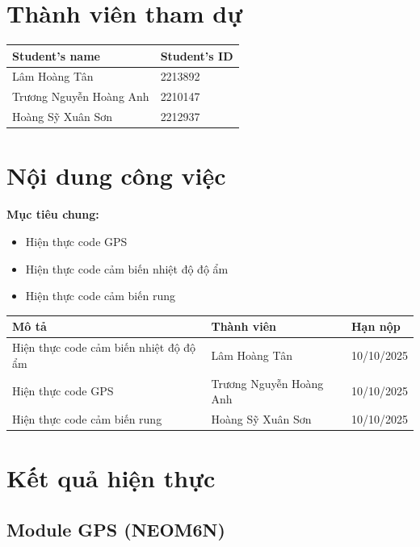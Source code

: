 \section{Thành viên tham dự}
\begin{table}[H]
\centering
\begin{tabular}{|l|l|}
\hline
\textbf{Student’s name} & \textbf{Student’s ID} \\ \hline
Lâm Hoàng Tân           & 2213892                \\ \hline
Trương Nguyễn Hoàng Anh & 2210147                \\ \hline
Hoàng Sỹ Xuân Sơn       & 2212937                \\ \hline
\end{tabular}
\end{table}

\section{Nội dung công việc}
\textbf{Mục tiêu chung:}
\begin{itemize}
\item Hiện thực code GPS
\item Hiện thực code cảm biến nhiệt độ độ ẩm 
\item Hiện thực code cảm biến rung
\end{itemize}

\begin{table}[H]
\centering
\begin{tabular}{|p{7cm}|p{4cm}|p{3cm}|}
\hline
\textbf{Mô tả} & \textbf{Thành viên} & \textbf{Hạn nộp} \\ \hline
Hiện thực code cảm biến nhiệt độ độ ẩm & Lâm Hoàng Tân & 10/10/2025 \\ \hline
Hiện thực code GPS & Trương Nguyễn Hoàng Anh & 10/10/2025 \\ \hline
Hiện thực code cảm biến rung  & Hoàng Sỹ Xuân Sơn & 10/10/2025 \\ \hline
\end{tabular}
\end{table}

\section{Kết quả hiện thực}

\subsection{Module GPS (NEO\text{-}M6N) }


